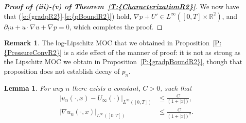 \documentclass[reqno,openright,11pt,twoside]{amsart}
\newtheorem{lemma}[theorem]{Lemma}
\theoremstyle{definition}
\newtheorem{remark}[theorem]{Remark}
\numberwithin{equation}{section}
\begin{document}
\begin{proof}[\textbf{Proof of {\textit{({iii})}}-{\textit{({v})}} of {Theorem~\ref{T:{CharacterizationR2}}}}]
We now have that {(\ref{e:{gradpR2}}-\ref{e:{pBoundR2}})} hold, ${\ensuremath{\nabla}} p + U' \in L^{\ensuremath{\infty}}([0, T] \times {\ensuremath{{\ensuremath{\mathbb{{R}}}}}}^2)$, and ${\ensuremath{\partial}}_t u + u \cdot {\ensuremath{\nabla}} u + {\ensuremath{\nabla}} p = 0$, which completes the proof.
\end{proof}

\begin{remark}
The log-Lipschitz MOC that we obtained in {Proposition~\ref{P:{PressureConvR2}}} is a side effect of the manner of proof: it is not as strong as the Lipschitz MOC we obtain in {Proposition~\ref{P:{gradpBoundR2}}}, though that proposition does not establish decay of $p_n$.
\end{remark}

\begin{lemma}\label{L:graduDecayR2}
    For any $n$ there exists a constant, $C > 0$, such that
    \begin{align*} 
        {\left\vert{u_n(\cdot, x) - U_{\ensuremath{\infty}}(\cdot)}\right\vert}_{L^{\ensuremath{\infty}}([0, T])}
            &\le \frac{C}{(1 + {\left\vert{x}\right\vert})}, \\
        {\left\vert{{\ensuremath{\nabla}} u_n(\cdot, x)}\right\vert}_{L^{\ensuremath{\infty}}([0, T])}
            &\le \frac{C}{(1 + {\left\vert{x}\right\vert})^2}.
    \end{align*}
\end{lemma}
\end{document}
